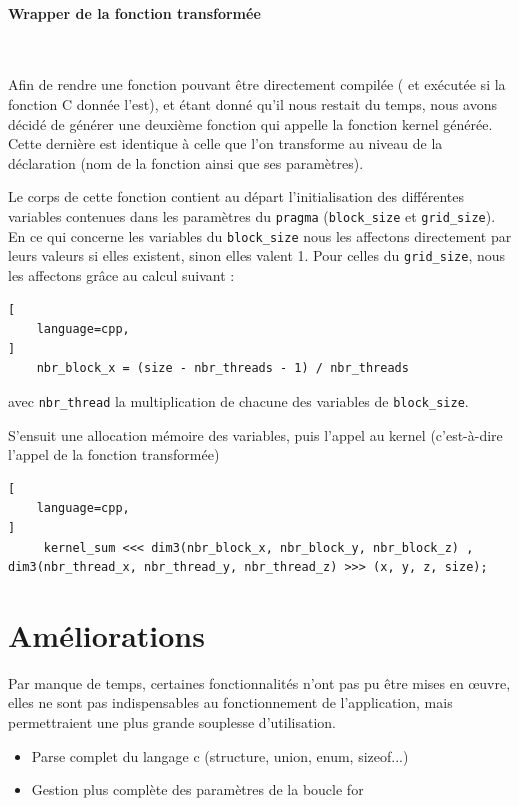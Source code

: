 \documentclass{article}
\begin{document}
	\paragraph{Wrapper de la fonction transformée}
	~~\\
	\indent
	
	Afin de rendre une fonction pouvant être directement compilée ( et exécutée si la fonction C donnée l'est), et étant donné qu'il nous restait du temps, nous avons décidé de générer une deuxième fonction qui appelle la fonction kernel générée. Cette dernière est identique à celle que l'on transforme au niveau de la déclaration (nom de la fonction ainsi que ses paramètres).
	
	Le corps de cette fonction contient au départ l'initialisation des différentes variables contenues dans les paramètres du \verb|pragma| (\verb|block_size| et \verb|grid_size|).
	En ce qui concerne les variables du \verb|block_size| nous les affectons directement par leurs valeurs si elles existent, sinon elles valent 1.
	Pour celles du \verb|grid_size|, nous les affectons grâce au calcul suivant : 
	\begin{lstlisting}[
    language=cpp,
]
	nbr_block_x = (size - nbr_threads - 1) / nbr_threads
\end{lstlisting}	
	 avec \verb|nbr_thread| la multiplication de chacune des variables de \verb|block_size|.
	
	S'ensuit une allocation mémoire des variables, puis l'appel au kernel (c'est-à-dire l'appel de la fonction transformée)
	\begin{lstlisting}[
    language=cpp,
]
	 kernel_sum <<< dim3(nbr_block_x, nbr_block_y, nbr_block_z) , dim3(nbr_thread_x, nbr_thread_y, nbr_thread_z) >>> (x, y, z, size);
\end{lstlisting}	

	\newpage

	
	
	
	\section{Améliorations}
	Par manque de temps, certaines fonctionnalités n'ont pas pu être mises en œuvre, elles ne sont pas indispensables au fonctionnement de l'application, mais permettraient une plus grande souplesse d'utilisation.
	\begin{itemize}
		\item Parse complet du langage c (structure, union, enum, sizeof...)
		\item Gestion plus complète des paramètres de la boucle for
	\end{itemize}
	
\end{document}

